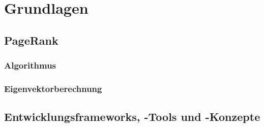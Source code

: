 \section{Grundlagen}

\subsection{PageRank}
\subsubsection{Algorithmus}
\subsubsection{Eigenvektorberechnung}
\subsection{Entwicklungsframeworks, -Tools und -Konzepte}